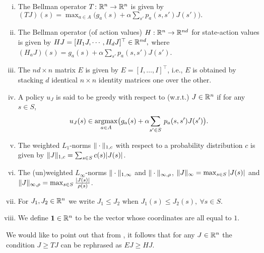 \documentclass[12pt,draftcls,onecolumn]{IEEEtran}
\begin{document}
\begin{definition}\label{notations}
\begin{comment}
Let $c,\rho,\chi:S \to \R_+$ be positive valued functions, where $\R_+$ denotes the set of strictly positive reals. Then for $J\in \R^n$, $a\in A$ and $s\in S$,
define
\end{comment}
\begin{enumerate}[(i)]
\item\label{bellopval} The Bellman operator $T\colon \mathbb{R}^n \rightarrow \mathbb{R}^n$ is given by $(TJ)(s)=\max_{a \in A}\big(g_a(s)+\alpha \sum_{s'} p_a(s,s')J(s')\big).
$
\item \label{bellactval} The Bellman operator (of action values) $H: \mathbb{R}^n \to \mathbb{R}^{nd}$ for state-action values is given by $HJ=[ H_1 J,\cdots,H_d J]^\top\in \mathbb{R}^{nd},$ where $(H_a J)(s)= g_a(s)+\alpha \sum_{s'}p_a(s,s') J(s')$.
\item\label{emat} The $nd\times n$ matrix $E$ is given by $E=[I,\ldots,I]^\top$, i.e., $E$ is obtained by stacking $d$ identical $n\times n$ identity matrices one over the other.
\item\label{greedy} A policy $u_J$ is said to be greedy with respect to (w.r.t.) $J\in \mathbb{R}^n$ if for any $s\in S$,
\begin{align*} u_J(s)\in\underset{a\in A}{\operatorname{argmax}}\big(g_a(s)+\alpha \underset{s'\in S}{\sum}~ p_a(s,s')J(s')\big).\end{align*}
\item\label{norms} The weighted $L_1$-norms $\|\cdot\|_{1,c}$ with respect to a probability distribution $c$ is given by $
\|J\|_{1,c}=\sum_{s \in S} c(s)|J(s)|$.
\item The (un)weighted $L_\infty$-norms $\|\cdot\|_{1,\infty}$
and $\|\cdot\|_{\infty,\rho}$, $\|J\|_{\infty}=\max_{s\in S}|J(s)|$ and $\|J\|_{\infty,\rho}=\max_{s \in S} \frac{|J(s)|}{\rho(s)}$.
\item For $J_1, J_2\in \mathbb{R}^n$ we write $J_1\leq J_2$ when $J_1(s)\leq J_2(s),~\forall s\in S$.
\item We define $\mathbf{1}\in \mathbb{R}^n$ to be the vector whose coordinates are all equal to $1$.
\end{enumerate}
\end{definition}
We would like to point out that from , it follows that for any $J\in \mathbb{R}^n$ the condition $J\geq TJ$ can be rephrased as $EJ\geq HJ$.
\end{document}
